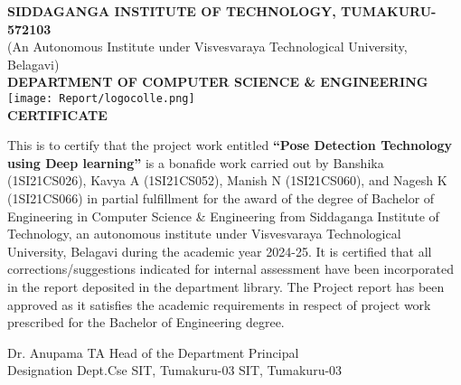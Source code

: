 \documentclass[a4paper,12pt]{report}
\begin{document}
\begin{titlepage}
    \centering

    \normalsize
    \textbf{SIDDAGANGA INSTITUTE OF TECHNOLOGY, TUMAKURU-572103} \\[0.2cm]
    (An Autonomous Institute under Visvesvaraya Technological University, Belagavi) \\[0.5cm]

    \textbf{DEPARTMENT OF COMPUTER SCIENCE \& ENGINEERING} \\[1cm]

    \texttt{[image: Report/logocolle.png]} \\[1cm] %

    \textbf{CERTIFICATE} \\[0.6cm]


    \begin{justify}
        This is to certify that the project work entitled \textbf{``Pose Detection Technology using Deep learning''} is a bonafide work carried out by
        Banshika (1SI21CS026), Kavya A (1SI21CS052), Manish N (1SI21CS060), and Nagesh K (1SI21CS066) in partial fulfillment for the award of the degree of Bachelor of Engineering in Computer Science \& Engineering from Siddaganga Institute of Technology, an autonomous institute under Visvesvaraya Technological University, Belagavi during the academic year 2024-25. It is certified that all corrections/suggestions indicated for internal assessment
        have been incorporated in the report deposited in the department library. The Project report has been approved as it satisfies the
        academic requirements in respect of project work prescribed for the Bachelor of Engineering degree.
    \end{justify}

    \Large
    \begin{center}
        Dr. Anupama TA \hspace{2cm} Head of the Department \hspace{2cm} Principal \\[1cm]
        Designation \hspace{2cm} Dept.Cse SIT, Tumakuru-03 \hspace{0.0007cm} 
        \hspace{0.0004cm} SIT, Tumakuru-03
    


\end{center}
\end{titlepage}
\end{document}
